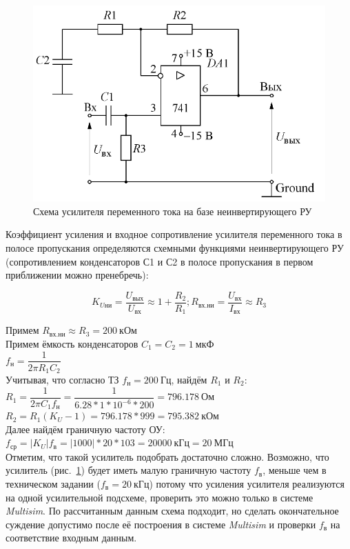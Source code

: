 \begin{figure}[H]
	\centering
	\includegraphics[width=0.7\linewidth]{photo/non_inverting_py}
	\caption{Схема усилителя переменного тока на базе неинвертирующего РУ}
	\label{fig:non_invertring_py}
\end{figure}

Коэффициент усиления и 
входное сопротивление 
усилителя переменного тока в полосе пропускания 
определяются схемными функциями неинвертирующего РУ 
(сопротивлением конденсаторов С1 и С2 в полосе пропускания 
в первом приближении можно пренебречь):

$$
K_{Uни} = \dfrac{U_{вых}}{U_{вх}} \approx 1 + \dfrac{R_2}{R_1};
R_{вх. ни} = \dfrac{U_{вх}}{I_{вх}} \approx R_3
$$

Примем $ R_{вх. ни} \approx R_3 = 200~кОм $\\

Примем ёмкость конденсаторов $ C_1 = C_2 = 1~мкФ $\\

$ f_н = \dfrac{1}{2 \pi R_1 C_2} $\\

Учитывая, что согласно ТЗ $ f_н = 200~Гц $, найдём $ R_1 $ и $ R_2 $:\\

$ R_1 = \dfrac{1}{2 \pi C_1 f_н} = \dfrac{1}{6.28 * 1 * 10^{-6} * 200} = 796.178~Ом $\\

$ R_2 = R_1 (K_U - 1) = 796.178 * 999 = 795.382~кОм $\\

Далее найдём граничную частоту ОУ:\\

$ f_{ср} = |K_U| f_в = |1000| * 20 * 103 = 20000~кГц = 20~МГц  $\\

Отметим, что такой усилитель подобрать достаточно сложно. 
Возможно, что усилитель (рис.~\ref{fig:non_invertring_py}) 
будет иметь малую граничную частоту $ f_в $, 
меньше чем в техническом задании
($ f_в = 20~кГц $) потому что усиления усилителя реализуются 
на одной усилительной подсхеме, 
проверить это можно только в системе \textit{Multisim}. 
По рассчитанным данным схема подходит, 
но сделать окончательное суждение допустимо после её построения 
в системе \textit{Multisim} и проверки $ f_в $ 
на соответствие входным данным.

